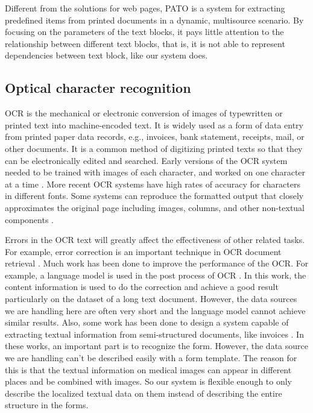 Different from the solutions for web pages, 
PATO \cite{bartoli2014semisupervised} 
is a system for extracting predefined items from 
printed documents in a dynamic, multisource scenario. By focusing on 
the parameters of the text blocks, it pays little attention to the 
relationship between different text blocks, that is, it is not able to
represent dependencies between text block, like our system does.

\subsection{Optical character recognition}
OCR is the mechanical or electronic conversion of images of 
typewritten or printed text into machine-encoded text. 
It is widely used as a form of data entry from printed paper 
data records, e.g., invoices, bank statement, receipts, mail, 
or other documents.  It is a common method 
of digitizing printed texts so that they can be electronically edited 
and searched. 
Early versions of the OCR system 
needed to be trained with images of each character, and 
worked on one character at a time \cite{mori1992historical}. 
More recent OCR systems have high rates of accuracy for 
characters in different fonts. 
Some systems can reproduce the formatted output that 
closely approximates the original page including images, columns, and 
other non-textual components \cite{smith2007overview}. 

Errors in the OCR text will greatly affect the effectiveness 
of other related tasks. For example, error correction is an important 
technique in OCR document retrieval \cite{darwish2007error} \cite{taghva1996evaluation}.
Much work has been done to improve the performance of the OCR. 
For example, a language model is used in the post process of OCR 
\cite{kolak2003generative}. 
In this work, the content information is used to do the correction 
and achieve a good result particularly on the dataset of a long text 
document. However, the data sources we are handling here are often 
very short and the language model cannot achieve similar results. 
Also, some work has been done to design a system capable of extracting 
textual information from semi-structured documents, 
like invoices \cite{cesarini1998informys}. 
In these works, an important part is to recognize the form. 
However, the data source we are handling can't be described 
easily with a form template. The reason for this is that the 
textual information on medical images can appear in 
different places and be combined 
with images. So our system is flexible enough to only describe the localized 
textual data on them instead of describing the entire structure in the forms. 

